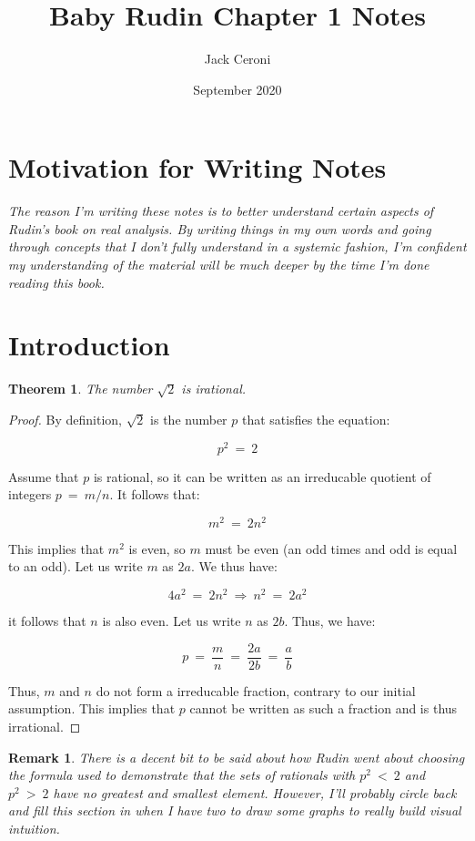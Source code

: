 \documentclass[10pt, oneside]{article}
\title{Baby Rudin Chapter 1 Notes}
\author{Jack Ceroni}
\date{September 2020}
\newtheorem{thm}{Theorem}
\newtheorem{rem}{Remark}
\begin{document}
\maketitle
\tableofcontents

\vspace{.25in}

\section{Motivation for Writing Notes}

\textit{The reason I'm writing these notes is to better understand certain aspects of Rudin's
	book on real analysis. By writing things in my own words and going through 
	concepts that I don't fully understand in a systemic fashion, I'm confident my 
	understanding of the material will be much deeper by the time I'm done reading this book.}

\section{Introduction}

\begin{thm}
The number $\sqrt{2}$ is irational.
\end{thm}

\begin{proof}
	By definition, $\sqrt{2}$ is the number $p$ that satisfies the 
	equation:

	$$p^2 \ = \ 2$$

	Assume that $p$ is rational, so it can be written as an irreducable 
	quotient of integers $p \ = \ m/n$. It follows that:

	$$m^2 \ = \ 2n^2$$

	This implies that $m^2$ is even, so $m$ must be even (an odd times and odd is equal
	to an odd). Let us write $m$ as $2a$. We thus have:

	$$4a^2 \ = \ 2n^2 \ \Rightarrow \ n^2 \ = \ 2a^2$$

	it follows that $n$ is also even. Let us write $n$ as $2b$. Thus, we have:

	$$p \ = \ \frac{m}{n} \ = \ \frac{2a}{2b} \ = \ \frac{a}{b}$$

	Thus, $m$ and $n$ do not form a irreducable fraction, contrary to our initial 
	assumption. This implies that $p$ cannot be written as such a fraction and is thus 
	irrational.
\end{proof}

\begin{rem}
There is a decent bit to be said about how Rudin went about choosing the formula used to demonstrate that the sets of rationals with $p^2 \ < \ 2$ and $p^2 \ > \ 2$ have no greatest and smallest element. However, I'll probably circle back and fill this section in when I have two to draw some graphs to really build visual intuition.
\end{rem}
\end{document}
